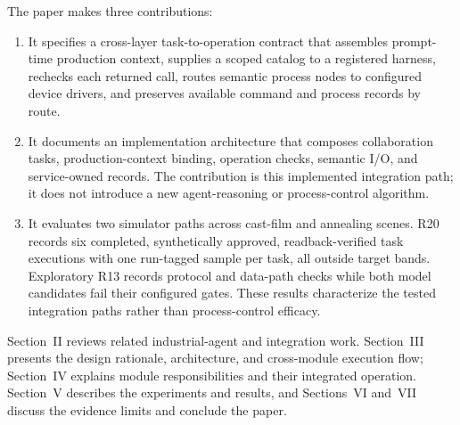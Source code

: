 The paper makes three contributions:
\begin{enumerate}
\item It specifies a cross-layer task-to-operation contract that assembles
  prompt-time production context, supplies a scoped catalog to a registered
  harness, rechecks each returned call, routes semantic process nodes to
  configured device drivers, and preserves available command and process
  records by route.
\item It documents an implementation architecture that composes collaboration
  tasks, production-context binding, operation checks, semantic I/O, and
  service-owned records. The contribution is this implemented integration
  path; it does not introduce a new agent-reasoning or process-control
  algorithm.
\item It evaluates two simulator paths across cast-film and annealing scenes.
  R20 records six completed, synthetically approved, readback-verified task
  executions with one run-tagged sample per task, all outside target bands.
  Exploratory R13 records protocol and data-path checks while both model
  candidates fail their configured gates. These results characterize the
  tested integration paths rather than process-control efficacy.
\end{enumerate}

Section~II reviews related industrial-agent and integration work.
Section~III presents the design rationale, architecture, and cross-module
execution flow; Section~IV explains module responsibilities and their
integrated operation. Section~V describes the experiments and results, and
Sections~VI and~VII discuss the evidence limits and conclude the paper.
